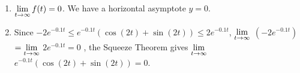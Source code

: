 \documentclass{ximera}
\begin{document}
\begin{enumerate}
\begin{enumerate}
\item $\ds{\lim_{t \rightarrow \infty} f(t) = 0}$.   We have a horizontal asymptote $y = 0$.

\smallskip

\item   Since   $-2 e^{-0.1t}  \leq e^{-0.1t} \left( \cos(2t) + \sin(2t)\right) \leq 2 e^{-0.1t}$,   $\ds{\lim_{t \rightarrow \infty}}$  $\left(- 2 e^{-0.1t}\right)$ $ = \ds{\lim_{t \rightarrow \infty}}$ $2 e^{-0.1t}=0$ , the Squeeze Theorem gives  $\ds{\lim_{t \rightarrow \infty}}$ $ e^{-0.1t} \left( \cos(2t) + \sin(2t)\right) = 0$.


\end{enumerate}

\smallskip


\setcounter{HW}{\value{enumi}}

\end{enumerate}
\end{document}
